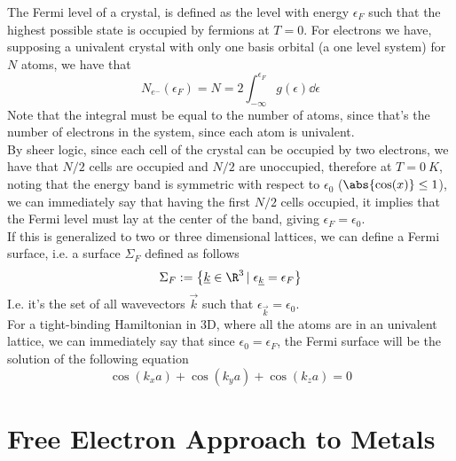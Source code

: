 \documentclass[../qm.tex]{subfiles}
\begin{document}
The Fermi level of a crystal, is defined as the level with energy $\epsilon_F$ such that the highest possible state is occupied by fermions at $T=0$. For electrons we have, supposing a univalent crystal with only one basis orbital (a one level system) for $N$ atoms, we have that
\begin{equation}
	N_{e^-}(\epsilon_F)=N=2\int_{-\infty}^{\epsilon_F}g(\epsilon)\dd\epsilon
	\label{eq:fermilevelcrystal}
\end{equation}
Note that the integral must be equal to the number of atoms, since that's the number of electrons in the system, since each atom is univalent.\\
By sheer logic, since each cell of the crystal can be occupied by two electrons, we have that $N/2$ cells are occupied and $N/2$ are unoccupied, therefore at $T=0\ K$, noting that the energy band is symmetric with respect to $\epsilon_0$ ($\abs{\cos(x)}\le1$), we can immediately say that having the first $N/2$ cells occupied, it implies that the Fermi level must lay at the center of the band, giving $\epsilon_F=\epsilon_0$.\\
If this is generalized to two or three dimensional lattices, we can define a Fermi surface, i.e. a surface $\Sigma_F$ defined as follows
\begin{equation*}
	\Sigma_F:=\left\{\vec{k}\in\R^3\left|\right. \epsilon_{\vec{k}}=\epsilon_F \right\}
\end{equation*}
I.e. it's the set of all wavevectors $\vec{k}$ such that $\epsilon_{\vec{k}}=\epsilon_0$.\\
For a tight-binding Hamiltonian in 3D, where all the atoms are in an univalent lattice, we can immediately say that since $\epsilon_0=\epsilon_F$, the Fermi surface will be the solution of the following equation
\begin{equation}
	\cos(k_xa)+\cos(k_ya)+\cos(k_za)=0
	\label{eq:3dlatticefermilevel}
\end{equation}
\section{Free Electron Approach to Metals}
\end{document}
